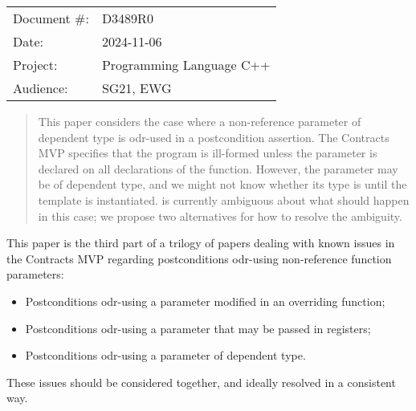 \begin{tabular}{ll}
Document \#: & D3489R0 \\
Date: &2024-11-06 \\
Project: & Programming Language C++ \\
Audience: & SG21, EWG
\end{tabular}

\begin{abstract}
This paper considers the case where a non-reference parameter of dependent type is odr-used in a postcondition assertion. The Contracts MVP \cite{P2900R10} specifies that the program is ill-formed unless the parameter is declared  on all declarations of the function. However, the parameter may be of dependent type, and we might not know whether its type is  until the template is instantiated. \cite{P2900R10} is currently ambiguous about what should happen in this case; we propose two alternatives for how to resolve the ambiguity.
\end{abstract}







This paper is the third part of a trilogy of papers dealing with known issues in the Contracts MVP \cite{P2900R10} regarding postconditions odr-using non-reference function parameters:
\begin{itemize}
\item \cite{D3484R1} Postconditions odr-using a parameter modified in an overriding function;
\item \cite{D3487R0} Postconditions odr-using a parameter that may be passed in registers;
\item \cite{D3489R0} Postconditions odr-using a parameter of dependent type.
\end{itemize}
These issues should be considered together, and ideally resolved in a consistent way.

